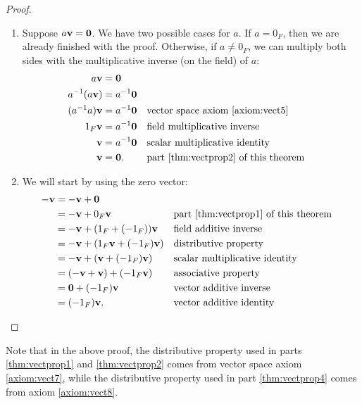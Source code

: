 \begin{proof}
\begin{enumerate}
    \item Suppose $ a\mathbf{v}=\mathbf{0} $. We have two possible cases for $ a $. If $ a=0_F $, then we are already finished with the proof. Otherwise, if $ a\neq 0_F $, we can multiply both sides with the multiplicative inverse (on the field) of $ a $:
    \begin{align*}
        a\mathbf{v} &= \mathbf{0} \\
        a^{-1}(a\mathbf{v}) &= a^{-1}\mathbf{0} \\
        (a^{-1}a)\mathbf{v} &= a^{-1}\mathbf{0} && \text{vector space axiom \ref{axiom:vect5}} \\
        1_F\mathbf{v} &= a^{-1}\mathbf{0} && \text{field multiplicative inverse} \\
        \mathbf{v} &= a^{-1}\mathbf{0} && \text{scalar multiplicative identity} \\
        \mathbf{v} &= \mathbf{0}. && \text{part \ref{thm:vectprop2} of this theorem}
    \end{align*}

    \item We will start by using the zero vector:
    \begin{align*}
        -\mathbf{v} &= -\mathbf{v}+\mathbf{0} \\
        &= -\mathbf{v}+0_F\mathbf{v} && \text{part \ref{thm:vectprop1} of this theorem} \\
        &= -\mathbf{v}+(1_F+(-1_F))\mathbf{v} && \text{field additive inverse} \\
        &= -\mathbf{v}+(1_F\mathbf{v}+(-1_F)\mathbf{v}) && \text{distributive property} \\
        &= -\mathbf{v}+(\mathbf{v}+(-1_F)\mathbf{v}) && \text{scalar multiplicative identity} \\
        &= (-\mathbf{v}+\mathbf{v})+(-1_F\mathbf{v}) && \text{associative property} \\
        &= \mathbf{0}+(-1_F)\mathbf{v} && \text{vector additive inverse} \\
        &= (-1_F)\mathbf{v}. && \text{vector additive identity} \qedhere
    \end{align*}
\end{enumerate}
\end{proof}

Note that in the above proof, the distributive property used in parts \ref{thm:vectprop1} and \ref{thm:vectprop2} comes from vector space axiom \ref{axiom:vect7}, while the distributive property used in part \ref{thm:vectprop4} comes from axiom \ref{axiom:vect8}.

